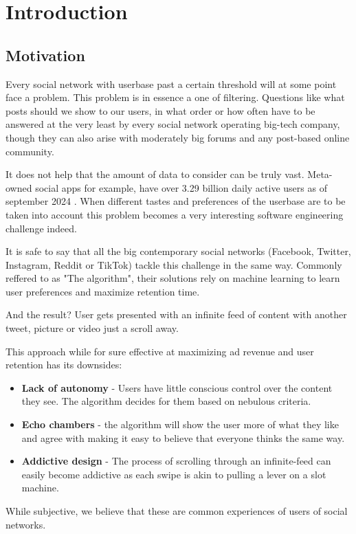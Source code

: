 \chapter*{Introduction}

\section*{Motivation}

Every social network with userbase past a certain threshold will at some point face a problem.
This problem is in essence a one of filtering.
Questions like what posts should we show to our users, in what order or how often have to be answered at the very least by every social network operating big-tech company,
though they can also arise with moderately big forums and any post-based online community. 

It does not help that the amount of data to consider can be truly vast.
Meta-owned social apps for example, have over 3.29 billion daily active users as of september 2024 \cite{meta_dau_2024}.
When different tastes and preferences of the userbase are to be taken into account
this problem becomes a very interesting software engineering challenge indeed.

It is safe to say that all the big contemporary social networks (Facebook, Twitter, Instagram, Reddit or TikTok)
tackle this challenge in the same way.
Commonly reffered to as "The algorithm",
their solutions rely on machine learning to learn user preferences and maximize retention time.

And the result? User gets presented with an infinite feed of content
with another tweet, picture or video just a scroll away.

This approach while for sure effective at maximizing ad revenue and user retention has its downsides:
\begin{itemize}
  \item \textbf{Lack of autonomy} - Users have little conscious control over the content they see. The algorithm decides for them based on nebulous criteria.
  \item \textbf{Echo chambers} - the algorithm will show the user more of what they like and agree with making it easy to believe that
  everyone thinks the same way.
  \item \textbf{Addictive design} - The process of scrolling through an infinite-feed can easily become addictive as each swipe is akin to pulling a lever on a slot machine.
\end{itemize}
While subjective, we believe that these are common experiences of users of social networks.

